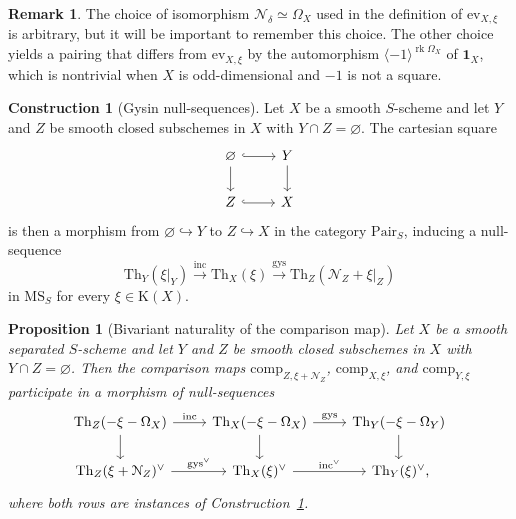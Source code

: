 \documentclass{amsart}
\numberwithin{equation}{section}
\theoremstyle{plain}
\newtheorem{proposition}[equation]{Proposition}
\theoremstyle{definition}
\newtheorem{construction}[equation]{Construction}
\newtheorem{remark}[equation]{Remark}
\let\scr=\mathcal
\def\1{\mathbf 1}
\let\into=\hookrightarrow
\let\emptyset=\varnothing
\def\Th{\mathrm{Th}}
\DeclareMathOperator{\rk}{rk}
\def\K{\mathrm{K}{}}
\def\MS{\mathrm{MS}}
\def\ev{\mathrm{ev}}
\def\gys{\mathrm{gys}{}}
\begin{document}
\begin{remark}
	The choice of isomorphism $\scr N_\delta\simeq\Omega_X$ used in the definition of $\ev_{X,\xi}$ is arbitrary, but it will be important to remember this choice. The other choice yields a pairing that differs from $\ev_{X,\xi}$ by the automorphism $\langle -1\rangle^{\rk\Omega_X}$ of $\1_X$, which is nontrivial when $X$ is odd-dimensional and $-1$ is not a square.
\end{remark}

\begin{construction}[Gysin null-sequences]
	\label{ctr:null-sequences}
	Let $X$ be a smooth $S$-scheme and let $Y$ and $Z$ be smooth closed subschemes in $X$ with $Y\cap Z=\emptyset$.
	The cartesian square
	\[
	\begin{tikzcd}
		\emptyset \ar[hook]{r} \ar{d} & Y \ar{d} \\
		Z \ar[hook]{r} & X
	\end{tikzcd}
	\]
	is then a morphism from $\emptyset\into Y$ to $Z\into X$ in the category $\mathrm{Pair}_S$, inducing a null-sequence
	\[
	\Th_Y(\xi|_Y) \xrightarrow{\mathrm{inc}} \Th_X(\xi) \xrightarrow{\gys} \Th_Z(\scr N_Z+\xi|_Z)
	\]
	in $\MS_S$ for every $\xi\in\K(X)$. 
\end{construction}

\begin{proposition}[Bivariant naturality of the comparison map]
	\label{prop:null-sequences}
	Let $X$ be a smooth separated $S$-scheme and let $Y$ and $Z$ be smooth closed subschemes in $X$ with $Y\cap Z=\emptyset$.
	Then the comparison maps $\mathrm{comp}_{Z,\xi+\scr N_Z}$, $\mathrm{comp}_{X,\xi}$, and $\mathrm{comp}_{Y,\xi}$ participate in a morphism of null-sequences
	\begin{equation}\label{eqn:null-sequences}
	\begin{tikzcd}
		\Th_Z(-\xi-\Omega_X) \ar{r}{\mathrm{inc}} \ar{d} & \Th_X(-\xi-\Omega_X) \ar{r}{\mathrm{gys}} \ar{d} & \Th_Y(-\xi-\Omega_Y) \ar{d} \\
		\Th_Z(\xi+\scr N_Z)^\vee \ar{r}{\mathrm{gys}^\vee} & \Th_X(\xi)^\vee \ar{r}{\mathrm{inc}^\vee} & \Th_Y(\xi)^\vee\rlap,
	\end{tikzcd}
	\end{equation}
	where both rows are instances of Construction~\ref{ctr:null-sequences}.
\end{proposition}
\end{document}
